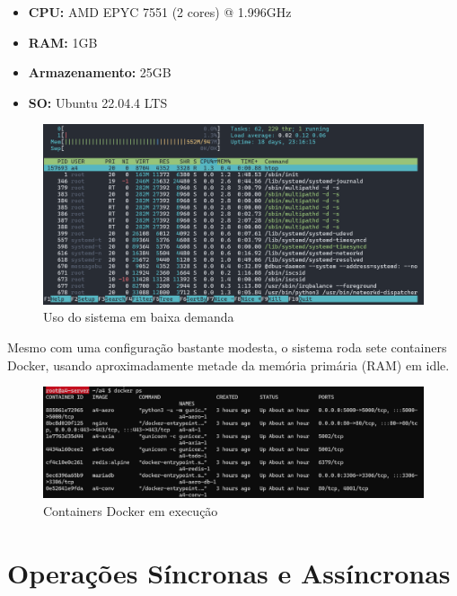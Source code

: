 \begin{itemize}
    \item \textbf{CPU:} AMD EPYC 7551 (2 cores) @ 1.996GHz
    \item \textbf{RAM:} 1GB
    \item \textbf{Armazenamento:} 25GB
    \item \textbf{SO:} Ubuntu 22.04.4 LTS
\end{itemize}

\begin{figure}[ht]
    \begin{center}
    \includegraphics[width=400pt]{img/prod-idle.png}
    \caption{Uso do sistema em baixa demanda}
    \label{fig:prod-idle}
    \end{center}
\end{figure}

Mesmo com uma configuração bastante modesta, o sistema roda sete containers Docker, usando 
aproximadamente metade da memória primária (RAM) em idle.

\begin{figure}[ht]
    \begin{center}
    \includegraphics[width=400pt]{img/containers.png}
    \caption{Containers Docker em execução}
    \label{fig:containers}
    \end{center}
\end{figure}

\section{Operações Síncronas e Assíncronas}

